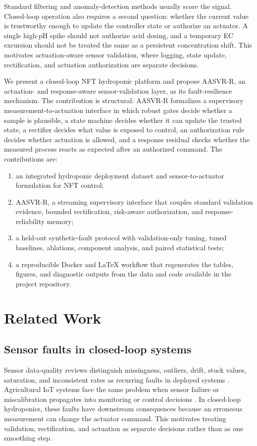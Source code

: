 \documentclass[preprint,12pt,doubleblind]{elsarticle}
\begin{document}
Standard filtering and anomaly-detection methods usually score the signal. Closed-loop operation also requires a second question: whether the current value is trustworthy enough to update the controller state or authorize an actuator. A single high-pH spike should not authorize acid dosing, and a temporary EC excursion should not be treated the same as a persistent concentration shift. This motivates actuation-aware sensor validation, where logging, state update, rectification, and actuation authorization are separate decisions.

We present a closed-loop NFT hydroponic platform and propose AASVR-R, an actuation- and response-aware sensor-validation layer, as its fault-resilience mechanism. The contribution is structural: AASVR-R formalizes a supervisory measurement-to-actuation interface in which robust gates decide whether a sample is plausible, a state machine decides whether it can update the trusted state, a rectifier decides what value is exposed to control, an authorization rule decides whether actuation is allowed, and a response residual checks whether the measured process reacts as expected after an authorized command. The contributions are:
\begin{enumerate}
\item an integrated hydroponic deployment dataset and sensor-to-actuator formulation for NFT control;
\item AASVR-R, a streaming supervisory interface that couples standard validation evidence, bounded rectification, risk-aware authorization, and response-reliability memory;
\item a held-out synthetic-fault protocol with validation-only tuning, tuned baselines, ablations, component analysis, and paired statistical tests;
\item a reproducible Docker and LaTeX workflow that regenerates the tables, figures, and diagnostic outputs from the data and code available in the project repository.
\end{enumerate}

\section{Related Work}
\subsection{Sensor faults in closed-loop systems}
Sensor data-quality reviews distinguish missingness, outliers, drift, stuck values, saturation, and inconsistent rates as recurring faults in deployed systems \cite{teh2020sensorquality}. Agricultural IoT systems face the same problem when sensor failure or miscalibration propagates into monitoring or control decisions \cite{zou2023agriiotfaults,lin2019sensortalk}. In closed-loop hydroponics, these faults have downstream consequences because an erroneous measurement can change the actuator command. This motivates treating validation, rectification, and actuation as separate decisions rather than as one smoothing step.
\end{document}

